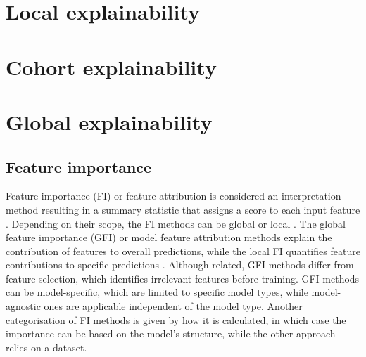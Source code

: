 



\section{Local explainability}
\label{sec:local_explainability}


\section{Cohort explainability}
\label{sec:cohort_explainability}


\section{Global explainability}
\label{sec:global_explainability}

\subsection{Feature importance} \label{subsec:feature-importance-in-tree-ensemble-models}
Feature importance (FI) or feature attribution is considered an interpretation method resulting in a summary statistic that assigns a score to each input feature \cite{molnar2022}.
Depending on their scope, the FI methods can be global or local \cite{Guidotti2018,molnar2022}.
The global feature importance (GFI) or model feature attribution methods explain the contribution of features to overall predictions, while the local FI quantifies feature contributions to specific predictions \cite{molnar2022}.
Although related, GFI methods differ from feature selection, which identifies irrelevant features before training.
GFI methods can be model-specific, which are limited to specific model types, while model-agnostic ones are applicable independent of the model type\cite{molnar2022}.
Another categorisation of FI methods is given by how it is calculated, in which case the importance can be based on the model's structure, while the other approach relies on a dataset.

